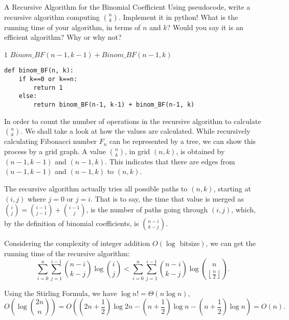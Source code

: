\documentclass[UTF8, a4paper, linespread=1.5]{article}
\begin{document}
\newpage
\begin{thm}{A Recursive Algorithm for the Binomial Coefficient}{}
   Using pseudocode, write a recursive algorithm computing
  ${n \choose k}$. Implement it in python! What is 
  the running time of your algorithm, in terms of $n$ and $k$? Would you say it is an efficient
  algorithm? Why or why not?
\end{thm}

\begin{algorithm}
    \caption{Binom\_BF: A Recursive Algorithm for the Binomial Coefficient.}
    \begin{algorithmic}
        \RETURN $1$
        \ELSE
        \RETURN $Binom\_BF(n-1, k-1) + Binom\_BF(n-1, k)$
        \ENDIF
    \end{algorithmic}
\end{algorithm}

\begin{verbatim}
def binom_BF(n, k):
    if k==0 or k==n:
        return 1
    else:
        return binom_BF(n-1, k-1) + binom_BF(n-1, k)
\end{verbatim}

In order to count the number of operations in the recursive algorithm to calculate $\displaystyle \binom n k$. We shall take a look at how the values are calculated. While recursively calculating Fibonacci number $F_n$ can be represented by a tree, we can show this process by a grid graph. A value $\displaystyle \binom n k$, in grid $(n, k)$, is obtained by $(n-1, k-1)$ and $(n-1, k)$. This indicates that there are edges from $(n-1, k-1)$ and $(n-1, k)$ to $(n, k)$.

The recursive algorithm actually tries all possible paths to $(n, k)$, starting at $(i, j)$ where $j = 0$ or $j = i$. That is to say, the time that value is merged as $\displaystyle \binom i j = \binom {i-1}{j-1} + \binom {i-1} j$, is the number of paths going through $(i, j)$, which, by the definition of binomial coefficients, is $\displaystyle \binom {n-i}{k-j}$.

Considering the complexity of integer addition $O(\log \text{ bitsize})$, we can get the running time of the recursive algorithm: $$\sum_{i=0}^n\sum_{j=1}^{i-1} \binom {n-i}{k-j} \log  \binom i j < \sum_{i=0}^n\sum_{j=1}^{i-1} \binom {n-i}{k-j} \log  \binom n {\left\lfloor \frac{n}{2} \right\rfloor }.$$

Using the Stirling Formula, we have $\log n! = \Theta (n \log n)$,
$$O(\log \binom {2n}n) = O ((2n+\frac{1}{2})\log 2n-(n+\frac{1}{2})\log n-(n+\frac{1}{2})\log n) = O(n).$$
\end{document}
